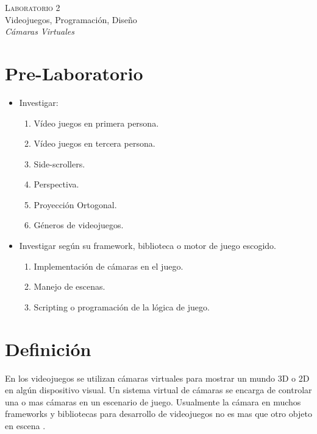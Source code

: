\begin{center}
\textsc{\Large Laboratorio 2}~\\
{\large Videojuegos, Programación, Diseño}~\\
\emph{Cámaras Virtuales}
\end{center}

\section{Pre-Laboratorio}
\begin{itemize}
\item Investigar:
\begin{enumerate}
  \item Vídeo juegos en primera persona.
  \item Vídeo juegos en tercera persona.
  \item Side-scrollers.
  \item Perspectiva.
  \item Proyección Ortogonal.
  \item Géneros de videojuegos.
\end{enumerate}
\item Investigar según su framework, biblioteca o motor de juego escogido.
\begin{enumerate}
	\item Implementación de cámaras en el juego.
	\item Manejo de escenas.
	\item Scripting o programación de la lógica de juego.
\end{enumerate}
\end{itemize}
\section{Definición}
En los videojuegos se utilizan cámaras virtuales para mostrar un mundo 3D o 2D en algún dispositivo visual. Un sistema virtual de cámaras se encarga de controlar una o mas cámaras en un escenario de juego. Usualmente la cámara en muchos frameworks y bibliotecas para desarrollo de videojuegos no es mas que otro objeto en escena \cite{fund_gamedesign}.
